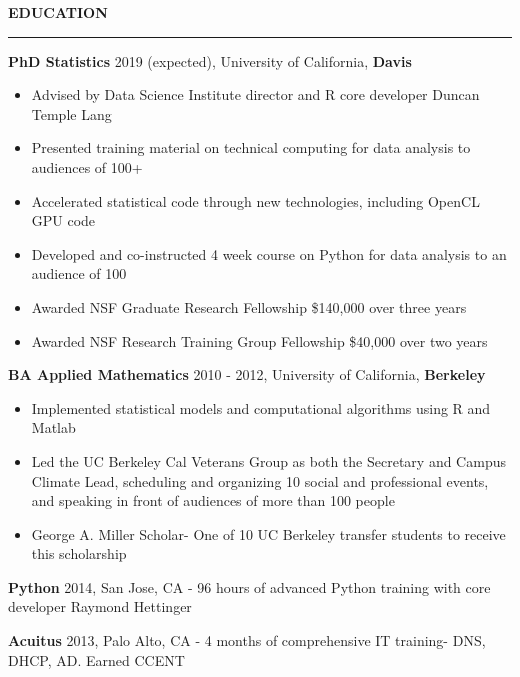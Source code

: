 \documentclass{article}
\begin{document}
\textbf{EDUCATION}
\vspace{0.2 cm}
\hrule
\vspace{0.1 cm}

\begin{description}

    \item \textbf{PhD Statistics}
    \hspace{.5cm}
        2019 (expected), University of California, \textbf{Davis}

\begin{itemize} 
    \item Advised by Data Science Institute director and R core developer Duncan Temple Lang
    \item Presented training material on technical computing for data
        analysis to
        audiences of 100+
    \item Accelerated statistical code through new technologies, including
        OpenCL GPU code
\item Developed and co-instructed 4 week course on Python for data
    analysis to an audience of 100 
    \item Awarded NSF Graduate Research Fellowship \$140,000 over three years
    \item Awarded NSF Research Training Group Fellowship \$40,000 over two years
\end{itemize} 

\item \textbf{BA Applied Mathematics}
\hspace{.5cm}
2010 - 2012, University of California, \textbf{Berkeley}

\begin{itemize} 
\item Implemented statistical models and computational algorithms
    using R and Matlab

\item Led the UC Berkeley Cal Veterans Group as both the Secretary and Campus Climate Lead, scheduling and organizing 10 social and professional events, and speaking in front of audiences of more than 100 people 

\item George A. Miller Scholar- One of 10 UC Berkeley transfer students to receive this scholarship
\end{itemize}

\item\textbf{Python}  \hspace{.5cm} 2014, San Jose, CA - 96 hours of advanced Python training with core
    developer Raymond Hettinger

\item\textbf{Acuitus}  \hspace{.5cm} 2013, Palo Alto, CA - 4 months of comprehensive IT training- DNS, DHCP, AD. Earned CCENT

\end{description}
\end{document}
